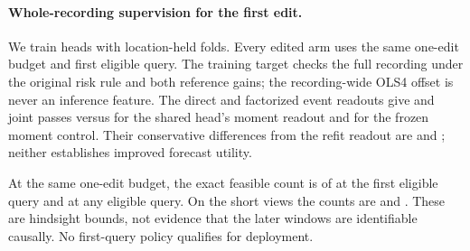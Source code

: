 \paragraph{Whole-recording supervision for the first edit.}
We train \FirstFits{} heads with location-held folds. Every edited
arm uses the same one-edit budget and first eligible query. The
training target checks the full recording under the original risk
rule and both reference gains; the recording-wide OLS4 offset is
never an inference feature. The direct and factorized event readouts
give \FirstDirect{} and \FirstFactor{} joint passes versus
\FirstRefit{} for the shared head's moment readout and
\FirstFrozen{} for the frozen moment control. Their conservative
differences from the refit readout are \FirstDirectEffect{} and
\FirstFactorEffect{}; neither establishes improved forecast utility.

At the same one-edit budget, the exact feasible count is
\FirstEarly{} of \FirstViews{} at the first eligible query and
\FirstAny{} at any eligible query. On the \FirstShort{} short views
the counts are \FirstShortEarly{} and \FirstShortAny{}. These are
hindsight bounds, not evidence that the later windows are identifiable
causally. No first-query policy qualifies for deployment.
